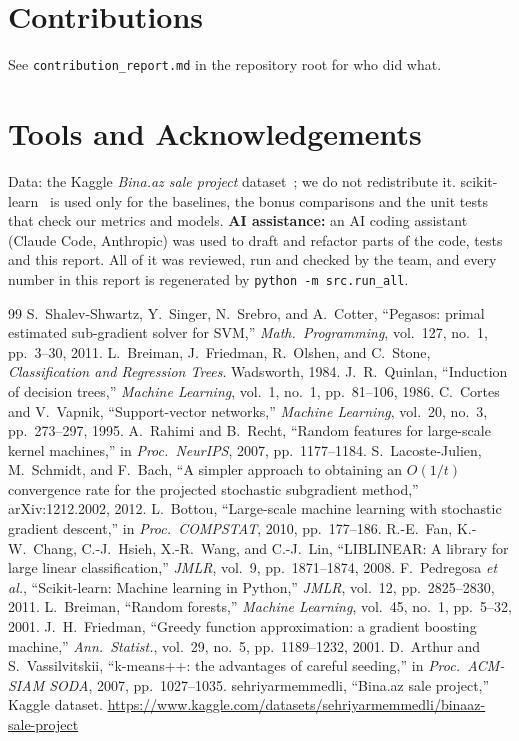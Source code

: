 \documentclass[10pt,twocolumn,a4paper]{article}
\begin{document}
\section*{Contributions}
See \texttt{contribution\_report.md} in the repository root for who did
what.

\section*{Tools and Acknowledgements}
Data: the Kaggle \emph{Bina.az sale project} dataset~\cite{data}; we do
not redistribute it. scikit-learn~\cite{sklearn} is used only for the
baselines, the bonus comparisons and the unit tests that check our
metrics and models. \textbf{AI assistance:} an AI coding assistant
(Claude Code, Anthropic) was used to draft and refactor parts of the
code, tests and this report. All of it was reviewed, run and checked by
the team, and every number in this report is regenerated by
\texttt{python -m src.run\_all}. %

\begin{thebibliography}{99}\small
{}
S.~Shalev-Shwartz, Y.~Singer, N.~Srebro, and A.~Cotter,
``Pegasos: primal estimated sub-gradient solver for SVM,''
\emph{Math.\ Programming}, vol.~127, no.~1, pp.~3--30, 2011.
L.~Breiman, J.~Friedman, R.~Olshen, and C.~Stone,
\emph{Classification and Regression Trees}. Wadsworth, 1984.
J.~R.~Quinlan, ``Induction of decision trees,''
\emph{Machine Learning}, vol.~1, no.~1, pp.~81--106, 1986.
C.~Cortes and V.~Vapnik, ``Support-vector networks,''
\emph{Machine Learning}, vol.~20, no.~3, pp.~273--297, 1995.
A.~Rahimi and B.~Recht, ``Random features for large-scale kernel
machines,'' in \emph{Proc.\ NeurIPS}, 2007, pp.~1177--1184.
S.~Lacoste-Julien, M.~Schmidt, and F.~Bach, ``A simpler approach to
obtaining an $O(1/t)$ convergence rate for the projected stochastic
subgradient method,'' arXiv:1212.2002, 2012.
L.~Bottou, ``Large-scale machine learning with stochastic gradient
descent,'' in \emph{Proc.\ COMPSTAT}, 2010, pp.~177--186.
R.-E.~Fan, K.-W.~Chang, C.-J.~Hsieh, X.-R.~Wang, and C.-J.~Lin,
``LIBLINEAR: A library for large linear classification,''
\emph{JMLR}, vol.~9, pp.~1871--1874, 2008.
F.~Pedregosa \emph{et al.}, ``Scikit-learn: Machine learning in Python,''
\emph{JMLR}, vol.~12, pp.~2825--2830, 2011.
L.~Breiman, ``Random forests,'' \emph{Machine Learning}, vol.~45, no.~1,
pp.~5--32, 2001.
J.~H.~Friedman, ``Greedy function approximation: a gradient boosting
machine,'' \emph{Ann.\ Statist.}, vol.~29, no.~5, pp.~1189--1232, 2001.
D.~Arthur and S.~Vassilvitskii, ``k-means++: the advantages of careful
seeding,'' in \emph{Proc.\ ACM-SIAM SODA}, 2007, pp.~1027--1035.
sehriyarmemmedli, ``Bina.az sale project,'' Kaggle dataset.
\url{https://www.kaggle.com/datasets/sehriyarmemmedli/binaaz-sale-project}
\end{thebibliography}
\end{document}
